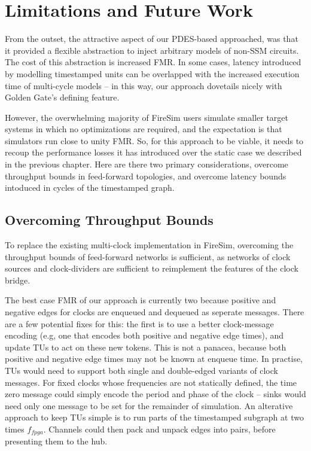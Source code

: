 
\section{Limitations and Future Work}\label{sec:pdes-future-work}

From the outset, the attractive aspect of our PDES-based approached, was that
it provided a flexible abstraction to inject arbitrary models of non-SSM
circuits. The cost of this abstraction is increased FMR. In some cases, latency
introduced by modelling timestamped units can be overlapped with the increased
execution time of multi-cycle models -- in this way, our approach dovetails
nicely with Golden Gate's defining feature.

However, the overwhelming majority of FireSim users simulate smaller target
systems in which no optimizations are required, and the expectation is that
simulators run close to unity FMR. So, for this approach to be viable, it needs to recoup the performance
losses it has introduced over the static case we described in the previous
chapter. Here are there two primary considerations, overcome throughput bounds
in feed-forward topologies, and overcome latency bounds intoduced in cycles of
the timestamped graph.

\subsection{Overcoming Throughput Bounds}
To replace the existing multi-clock implementation in FireSim, overcoming the throughput bounds of feed-forward networks
is sufficient, as networks of clock sources and clock-dividers are sufficient to reimplement the features of the clock bridge.

The best case FMR of our approach is currently two because positive and
negative edges for clocks are enqueued and dequeued as seperate messages. There
are a few potential fixes for this: the first is to use a better clock-message
encoding (e.g, one that encodes both positive and negative edge times), and
update TUs to act on these new tokens. This is not a panacea, because both
positive and negative edge times may not be known at enqueue time. In practise,
TUs would need to support both single and double-edged variants of clock
messages.  For fixed clocks whose frequencies are not statically defined, the
time zero message could simply encode the period and phase of the clock --
sinks would need only one message to be set for the remainder of simulation.
An alterative approach to keep TUs simple is to run parts of the timestamped
subgraph at two times $f_{fpga}$. Channels could then pack and unpack edges
into pairs, before presenting them to the hub.

